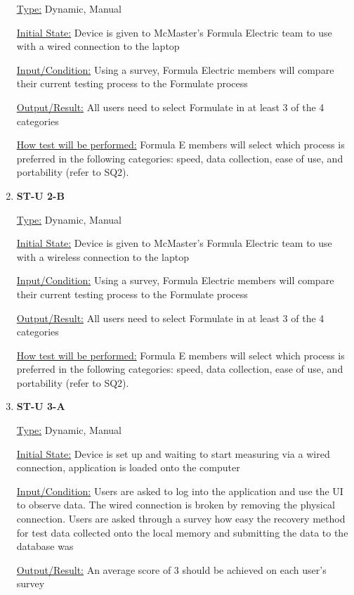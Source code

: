 \documentclass[12pt, titlepage]{article}
\begin{document}
\begin{enumerate}
\underline{Type:} Dynamic, Manual
					
\underline{Initial State:} Device is given to McMaster's Formula Electric team to use with a wired connection to the laptop
					
\underline{Input/Condition:} Using a survey, Formula Electric members will compare their current testing process to the Formulate process
					
\underline{Output/Result:} All users need to select Formulate in at least 3 of the 4 categories
					
\underline{How test will be performed:} Formula E members will select which process is preferred in the following categories: speed, data collection, ease of use, and portability (refer to SQ2).
\item{\bf{ST-U 2-B}}

\underline{Type:} Dynamic, Manual
					
\underline{Initial State:} Device is given to McMaster's Formula Electric team to use with a wireless connection to the laptop
					
\underline{Input/Condition:} Using a survey, Formula Electric members will compare their current testing process to the Formulate process
					
\underline{Output/Result:} All users need to select Formulate in at least 3 of the 4 categories
					
\underline{How test will be performed:} Formula E members will select which process is preferred in the following categories: speed, data collection, ease of use, and portability (refer to SQ2).
\item{\bf{ST-U 3-A}}

\underline{Type:} Dynamic, Manual
					
\underline{Initial State:} Device is set up and waiting to start measuring via a wired connection, application is loaded onto the computer
					
\underline{Input/Condition:} Users are asked to log into the application and use the UI to observe data. The wired connection is broken by removing the physical connection. Users are asked through a survey how easy the recovery method for test data collected onto the local memory and submitting the data to the database was
					
\underline{Output/Result:} An average score of 3 should be achieved on each user's survey
					

\end{enumerate}
\end{document}

